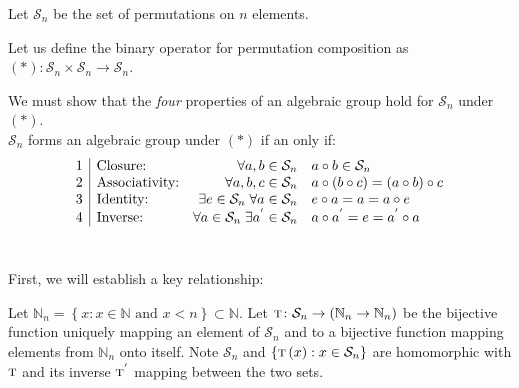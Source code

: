 \documentclass{AssignmentCUNY}
\newcommand{\Sn}{\ensuremath{\mathcal{S}_{n}}}
\newcommand{\ClosureQuantification}[1]{\ensuremath{\forall a, b \in #1}}
\newcommand{\ClosureProperty}[2]{\ensuremath{a #1 b \in #2}}
\newcommand{\AssociativityQuantification}[1]{\ensuremath{\forall a, b, c \in #1}}
\newcommand{\AssociativityProperty}[1]{\ensuremath{a #1 (b #1 c) = (a #1 b) #1 c}}
\newcommand{\IdentityQuantification}[1]{\ensuremath{\exists e \in #1\; \forall a \in #1}}
\newcommand{\IdentityProperty}[1]{\ensuremath{e #1 a = a = a #1 e}}
\newcommand{\InverseQuantification}[1]{\ensuremath{\forall a \in #1\; \exists a^{'} \in #1}}
\newcommand{\InverseProperty}[1]{\ensuremath{a #1 a^{'} = e = a^{'} #1 a}}
\begin{document}
%

Let $\Sn$ be the set of permutations on $n$ elements.

Let us define the binary operator for permutation composition as $\left(\ast\right) \colon \Sn \times \Sn \to \Sn$.

We must show that the \emph{four} properties of an algebraic group hold for $\Sn$ under $\left(\ast\right)$.\\


\begingroup
\setlength{\tabcolsep}{10pt} %
\renewcommand{\arraystretch}{1.5} %
$\Sn$ forms an algebraic group under $\left(\ast\right)$ if an only if:\\
\[
\begin{array}[t]{c|lrl}%
	\text{1} & \text{Closure:}       &       \ClosureQuantification{\Sn} &       \ClosureProperty{\circ}{\Sn} \\
	\text{2} & \text{Associativity:} & \AssociativityQuantification{\Sn} & \AssociativityProperty{\circ} \\
	\text{3} & \text{Identity:}      &      \IdentityQuantification{\Sn} &      \IdentityProperty{\circ} \\
	\text{4} & \text{Inverse:}       &       \InverseQuantification{\Sn} &       \InverseProperty{\circ}
\end{array}
\]
\endgroup\\

\newcommand{\Nn}{\ensuremath{\mathbb{N}_{n}}}
\newcommand{\Homo}[1]{\ensuremath{\textsc{t}\left(#1\right)}}
\newcommand{\HomoI}[1]{\ensuremath{\textsc{t}^{'}\left(#1\right)}}

First, we will establish a key relationship:

Let $\Nn = \left\{ x : x \in \mathbb{N} \text{ and } x < n\right\} \subset \mathbb{N}$.
Let $\textsc{t}\colon \Sn \to \left(\Nn \to \Nn\right)$ be the bijective function uniquely mapping an element of $\Sn$ and to a bijective function mapping elements from $\Nn$ onto itself.
Note $\Sn$ and $\left\{ \Homo{x} : x \in \Sn \right\}$ are homomorphic with $\textsc{t}$ and its inverse $\textsc{t}^{'}$ mapping between the two sets.
\end{document}
